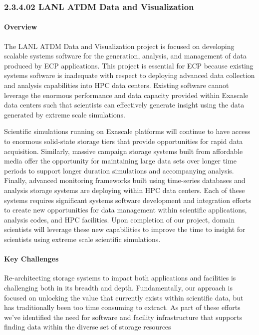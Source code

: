 \subsubsection{2.3.4.02 LANL ATDM Data and Visualization} 

\paragraph{Overview} 
The LANL ATDM Data and Visualization project is focused on developing scalable
systems software for the generation, analysis, and management of data
produced by ECP applications. This project is essential for ECP because
existing systems software is inadequate with respect to deploying advanced
data collection and analysis capabilities into HPC data centers. Existing
software cannot leverage the enormous performance and data capacity
provided within Exascale data centers such that scientists can effectively
generate insight using the data generated by extreme scale
simulations.

Scientific simulations running on Exascale platforms will
continue to have access to enormous solid-state storage tiers that provide 
opportunities for rapid data acquisition. Similarly, massive campaign storage
systems built from affordable media offer the opportunity for maintaining
large data sets over longer time periods to support longer duration
simulations and accompanying analysis. Finally, advanced monitoring frameworks
built using time-series databases and analysis storage systems are deploying
within HPC data centers. Each of these systems requires significant systems
software development and integration efforts to create new opportunities for data
management within scientific applications, analysis codes, and HPC
facilities. Upon completion of our project, domain scientists will
leverage these new capabilities to improve the
time to insight for scientists using extreme scale scientific simulations.

\paragraph{Key  Challenges}
Re-architecting storage systems to impact both applications and facilities is
challenging both in its breadth and depth. Fundamentally, our approach is
focused on unlocking the value that currently exists within scientific data,
but has traditionally been too time consuming to extract. As part of these
efforts we've identified the need for software and facility infrastructure
that supports finding data within the diverse set of storage resources

